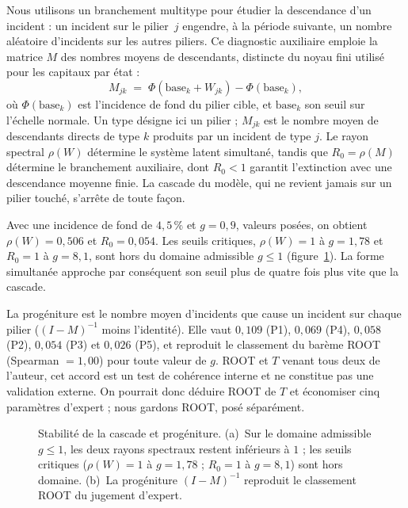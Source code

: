 Nous utilisons un branchement multitype pour étudier la descendance d'un incident : un incident
sur le pilier~$j$ engendre, à la période suivante, un nombre aléatoire d'incidents sur les autres
piliers. Ce diagnostic auxiliaire emploie la matrice $M$ des nombres moyens de descendants,
distincte du noyau fini utilisé pour les capitaux par état :
\begin{equation}
M_{jk}\;=\;\Phi(\text{base}_k+W_{jk})-\Phi(\text{base}_k),
\end{equation}
où $\Phi(\text{base}_k)$ est l'incidence de fond du pilier cible, et $\text{base}_k$ son seuil sur l'échelle normale. Un type désigne ici un pilier ; $M_{jk}$ est le nombre moyen de descendants directs de type $k$ produits par un incident de type $j$.
Le rayon spectral $\rho(W)$ détermine le système latent simultané, tandis que $R_0=\rho(M)$ détermine
le branchement auxiliaire, dont $R_0<1$ garantit l'extinction avec une descendance moyenne finie. La cascade du modèle, qui ne revient jamais sur un pilier touché, s'arrête de toute façon.

Avec une incidence de fond de
$4{,}5\,\%$ et $g=0{,}9$, valeurs posées, on obtient $\rho(W)=0{,}506$ et $R_0=0{,}054$. Les seuils critiques,
$\rho(W)=1$ à $g=1{,}78$ et $R_0=1$ à $g=8{,}1$, sont hors du domaine admissible $g\le1$
(figure~\ref{fig:branchement-R0-rapport}). La forme simultanée approche par conséquent son seuil
plus de quatre fois plus vite que la cascade.

La progéniture est le nombre moyen d'incidents que cause un incident sur chaque pilier ($(I-M)^{-1}$ moins
l'identité). Elle vaut $0{,}109$ (P1), $0{,}069$ (P4), $0{,}058$ (P2), $0{,}054$ (P3)
et $0{,}026$ (P5), et reproduit le classement du barème ROOT (Spearman $=1{,}00$) pour toute
valeur de $g$. ROOT et $T$ venant tous deux de l'auteur, cet accord est un test de cohérence
interne et ne constitue pas une validation externe. On pourrait donc déduire ROOT de $T$ et
économiser cinq paramètres d'expert ; nous gardons ROOT, posé séparément.

\begin{figure}[H]\centering
{}
\caption{Stabilité de la cascade et progéniture. (a)~Sur le domaine admissible $g\le1$, les deux
rayons spectraux restent inférieurs à $1$ ; les seuils critiques ($\rho(W)=1$ à $g=1{,}78$ ;
$R_0=1$ à $g=8{,}1$) sont hors domaine. (b)~La progéniture $(I-M)^{-1}$ reproduit le classement
ROOT du jugement d'expert.}
\label{fig:branchement-R0-rapport}
\end{figure}

